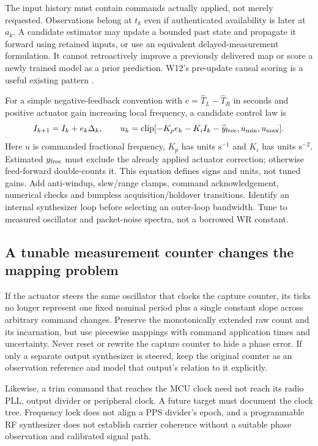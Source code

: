 \documentclass[11pt,letterpaper]{article}
\begin{document}
The input history must contain commands actually applied, not merely requested. Observations belong at $t_k$ even if authenticated availability is later at $a_k$. A candidate estimator may update a bounded past state and propagate it forward using retained inputs, or use an equivalent delayed-measurement formulation. It cannot retroactively improve a previously delivered map or score a newly trained model as a prior prediction. W12's pre-update causal scoring is a useful existing pattern \cite{localcode}.

For a simple negative-feedback convention with $e=\widehat T_L-\widehat T_R$ in seconds and positive actuator gain increasing local frequency, a candidate control law is
\begin{equation}
I_{k+1}=I_k+e_k\Delta_k,\qquad
u_k=\operatorname{clip}[-K_p e_k-K_i I_k-\widehat y_{\rm free},u_{\min},u_{\max}].
\label{eq:pi}
\end{equation}
Here $u$ is commanded fractional frequency, $K_p$ has units $\mathrm{s}^{-1}$ and $K_i$ has units $\mathrm{s}^{-2}$. Estimated $y_{\rm free}$ must exclude the already applied actuator correction; otherwise feed-forward double-counts it. This equation defines signs and units, not tuned gains. Add anti-windup, slew/range clamps, command acknowledgement, numerical checks and bumpless acquisition/holdover transitions. Identify an internal synthesizer loop before selecting an outer-loop bandwidth. Tune to measured oscillator and packet-noise spectra, not a borrowed WR constant.

\subsection{A tunable measurement counter changes the mapping problem}
If the actuator steers the same oscillator that clocks the capture counter, its ticks no longer represent one fixed nominal period plus a single constant slope across arbitrary command changes. Preserve the monotonically extended raw count and its incarnation, but use piecewise mappings with command application times and uncertainty. Never reset or rewrite the capture counter to hide a phase error. If only a separate output synthesizer is steered, keep the original counter as an observation reference and model that output's relation to it explicitly.

Likewise, a trim command that reaches the MCU clock need not reach its radio PLL, output divider or peripheral clock. A future target must document the clock tree. Frequency lock does not align a PPS divider's epoch, and a programmable RF synthesizer does not establish carrier coherence without a suitable phase observation and calibrated signal path.
\end{document}
